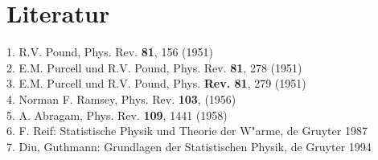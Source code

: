 \documentclass[12pt]{article}
\begin{document}
\section{Literatur}
1. R.V. Pound, Phys. Rev. {\bf 81}, 156 (1951) \\
2. E.M. Purcell und R.V. Pound, Phys. Rev. {\bf 81}, 278 (1951) \\ 
3. E.M. Purcell und R.V. Pound, Phys. {\bf Rev. 81}, 279 (1951) \\ 
4. Norman F. Ramsey, Phys. Rev. {\bf 103}, (1956) \\
5. A. Abragam, Phys. Rev. {\bf 109}, 1441 (1958) \\
6. F. Reif: Statistische Physik und Theorie der W"arme, de Gruyter 1987 \\
7. Diu, Guthmann: Grundlagen der Statistischen Physik, de Gruyter 1994 \\
\end{document}
